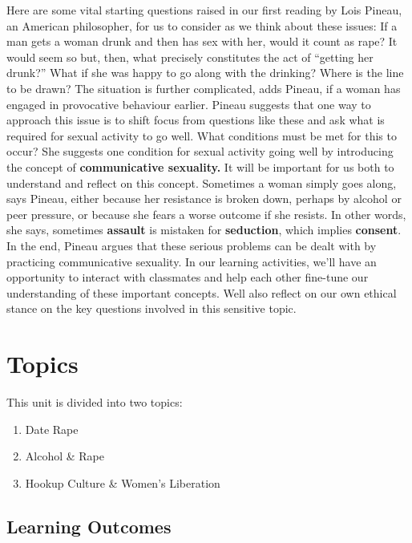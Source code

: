 \documentclass[
]{book}
\providecommand{\tightlist}{%
  \setlength{\itemsep}{0pt}\setlength{\parskip}{0pt}}
\begin{document}
Here are some vital starting questions raised in our first reading by Lois Pineau, an American philosopher, for us to consider as we think about these issues: If a man gets a woman drunk and then has sex with her, would it count as rape? It would seem so but, then, what precisely constitutes the act of ``getting her drunk?'' What if she was happy to go along with the drinking? Where is the line to be drawn? The situation is further complicated, adds Pineau, if a woman has engaged in provocative behaviour earlier.
Pineau suggests that one way to approach this issue is to shift focus from questions like these and ask what is required for sexual activity to go well. What conditions must be met for this to occur? She suggests one condition for sexual activity going well by introducing the concept of \textbf{communicative sexuality.} It will be important for us both to understand and reflect on this concept.
Sometimes a woman simply goes along, says Pineau, either because her resistance is broken down, perhaps by alcohol or peer pressure, or because she fears a worse outcome if she resists. In other words, she says, sometimes \textbf{assault} is mistaken for \textbf{seduction}, which implies \textbf{consent}. In the end, Pineau argues that these serious problems can be dealt with by practicing communicative sexuality.
In our learning activities, we'll have an opportunity to interact with classmates and help each other fine-tune our understanding of these important concepts. Well also reflect on our own ethical stance on the key questions involved in this sensitive topic.

\hypertarget{topics-5}{%
\section*{Topics}\label{topics-5}}

This unit is divided into two topics:

\begin{enumerate}
\def\labelenumi{\arabic{enumi}.}
\tightlist
\item
  Date Rape\\
\item
  Alcohol \& Rape\\
\item
  Hookup Culture \& Women's Liberation
\end{enumerate}

\hypertarget{learning-outcomes-5}{%
\subsection*{Learning Outcomes}\label{learning-outcomes-5}}
\end{document}
